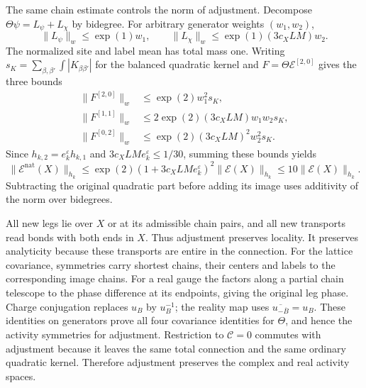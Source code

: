 The same chain estimate controls the norm of adjustment.
Decompose $\Theta\psi=L_\psi+L_\chi$ by bidegree. For arbitrary
generator weights $(w_1,w_2)$,
\[
 \|L_\psi\|_w\le\exp(1)w_1,\qquad
 \|L_\chi\|_w\le\exp(1)(3c_XLM)w_2.
\]
The normalized site and label mean has total mass one.
Writing $s_K=\sum_{\beta,\beta'}\int|K_{\beta\beta'}|$ for
the balanced quadratic kernel and $F=\Theta\mathscr E^{[2,0]}$
gives the three bounds
\[
 \begin{aligned}
 \|F^{[2,0]}\|_w&\le\exp(2)w_1^2s_K,\\
 \|F^{[1,1]}\|_w&\le2\exp(2)(3c_XLM)w_1w_2s_K,\\
 \|F^{[0,2]}\|_w&\le\exp(2)(3c_XLM)^2w_2^2s_K.
 \end{aligned}
\]
Since $h_{k,2}=e_k^\varepsilon h_{k,1}$ and
$3c_XLM e_k^\varepsilon\le1/30$, summing these bounds yields
\begin{equation}\label{eq:rg-adjustment-norm}
 \|\mathscr E^{\mathrm{nat}}(X)\|_{h_k}
 \le\exp(2)(1+3c_XLM e_k^\varepsilon)^2\|\mathscr E(X)\|_{h_k}
                                               \le10\|\mathscr E(X)\|_{h_k}.
\end{equation}
Subtracting the original quadratic part before adding its
image uses additivity of the norm over bidegrees.

All new legs lie over $X$ or at its admissible chain pairs,
and all new transports read bonds with both ends in $X$.
Thus adjustment preserves locality. It preserves analyticity
because these transports are entire in the connection.
For the lattice covariance, symmetries carry shortest chains,
their centers and labels to the corresponding image chains.
For a real gauge the factors along a partial chain telescope
to the phase difference at its endpoints, giving the original
leg phase. Charge conjugation replaces $u_B$ by $u_B^{-1}$;
the reality map uses $\overline{u_{-\overline B}}=u_B$.
These identities on generators prove all four covariance
identities for $\Theta$, and hence the activity symmetries
for adjustment. Restriction to $\mathscr C=0$ commutes with
adjustment because it leaves the same total connection and
the same ordinary quadratic kernel. Therefore adjustment
preserves the complex and real activity spaces.